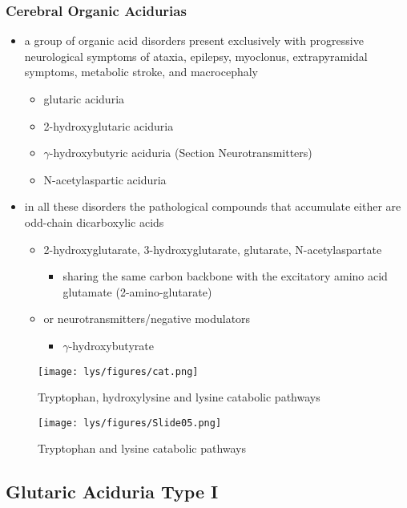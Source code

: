 \documentclass[12pt]{scrartcl}
\begin{document}
\begin{center}
\begin{center}
\subsubsection{Cerebral Organic Acidurias}
\label{sec:org8b89a98}
\begin{itemize}
\item a group of organic acid disorders present exclusively with
progressive neurological symptoms of ataxia, epilepsy, myoclonus,
extrapyramidal symptoms, metabolic stroke, and macrocephaly
\begin{itemize}
\item glutaric aciduria
\item 2-hydroxyglutaric aciduria
\item \(\gamma\)-hydroxybutyric aciduria (Section Neurotransmitters)
\item N-acetylaspartic aciduria
\end{itemize}
\item in all these disorders the pathological compounds that accumulate
either are odd-chain dicarboxylic acids
\begin{itemize}
\item 2-hydroxyglutarate, 3-hydroxyglutarate, glutarate, N-acetylaspartate
\begin{itemize}
\item sharing the same carbon backbone with the excitatory amino acid
glutamate (2-amino-glutarate)
\end{itemize}
\item or neurotransmitters/negative modulators
\begin{itemize}
\item \(\gamma\)-hydroxybutyrate
\end{itemize}
\end{itemize}
\end{itemize}

\begin{figure}[htbp]
\centering
\texttt{[image: lys/figures/cat.png]}
\caption{\label{fig:orge99b779}Tryptophan, hydroxylysine and lysine catabolic pathways}
\end{figure}


\begin{figure}[htbp]
\centering
\texttt{[image: lys/figures/Slide05.png]}
\caption{\label{fig:org7473bec}Tryptophan and lysine catabolic pathways}
\end{figure}

\subsection{Glutaric Aciduria Type I}
\label{sec:org01a2eb5}

\end{center}
\end{center}
\end{document}
